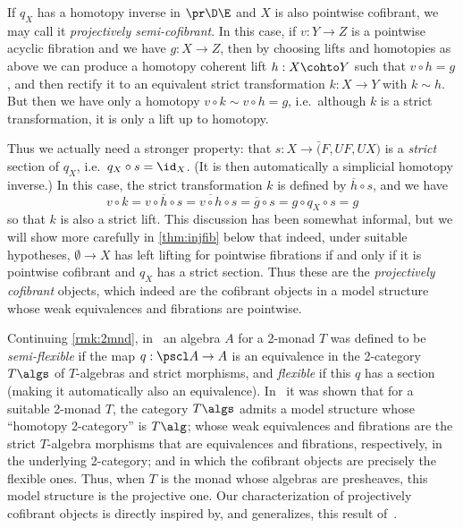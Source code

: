 If $q_X$ has a homotopy inverse in $\pr\D\E$ and $X$ is also pointwise cofibrant, we may call it \emph{projectively semi-cofibrant}.
In this case, if $v:Y\to Z$ is a pointwise acyclic fibration and we have $g:X\to Z$, then by choosing lifts and homotopies as above we can produce a homotopy coherent lift $h:X\cohto Y$ such that $v \circ h = g$, and then rectify it to an equivalent strict transformation $k:X\to Y$ with $k\sim h$.
But then we have only a homotopy $v\circ k \sim v\circ h = g$, i.e.\ although $k$ is a strict transformation, it is only a lift up to homotopy.

Thus we actually need a stronger property: that $s:X\to \bar(F,UF,UX)$ is a \emph{strict} section of $q_X$, i.e.\ $q_X \circ s = \id_X$.
(It is then automatically a simplicial homotopy inverse.)
In this case, the strict transformation $k$ is defined by $\overline{h} \circ s$, and we have
\[v \circ k = v\circ \overline{h}\circ s = \overline{v\circ h} \circ s = \overline{g} \circ s = g\circ q_X \circ s = g \]
so that $k$ is also a strict lift.
This discussion has been somewhat informal, but we will show more carefully in \cref{thm:injfib} below that indeed, under suitable hypotheses, $\emptyset\to X$ has left lifting for pointwise fibrations if and only if it is pointwise cofibrant and $q_X$ has a strict section.
Thus these are the \emph{projectively cofibrant} objects, which indeed are the cofibrant objects in a model structure whose weak equivalences and fibrations are pointwise.

\begin{rmk}\label{rmk:flexible}
  Continuing \cref{rmk:2mnd}, in~\cite{bkp:2dmonads} an algebra $A$ for a 2-monad $T$ was defined to be \emph{semi-flexible} if the map $q : \pscl A\to A$ is an equivalence in the 2-category $T\algs$ of $T$-algebras and strict morphisms, and \emph{flexible} if this $q$ has a section (making it automatically also an equivalence).
  In~\cite{lack:htpy-2monads} it was shown that for a suitable 2-monad $T$, the category $T\algs$ admits a model structure whose ``homotopy 2-category'' is $T\alg$; whose weak equivalences and fibrations are the strict $T$-algebra morphisms that are equivalences and fibrations, respectively, in the underlying 2-category; and in which the cofibrant objects are precisely the flexible ones.
  Thus, when $T$ is the monad whose algebras are presheaves, this model structure is the projective one.
  Our characterization of projectively cofibrant objects is directly inspired by, and generalizes, this result of~\cite{lack:htpy-2monads}.
\end{rmk}

